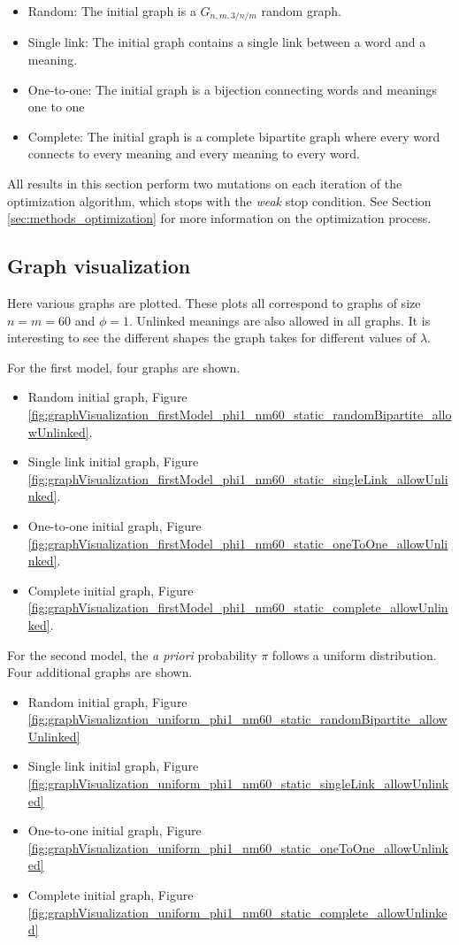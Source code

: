 \begin{itemize}
\item Random: The initial graph is a $G_{n,m,3/n/m}$ random graph.
\item Single link: The initial graph contains a single link between a word and a meaning.
\item One-to-one: The initial graph is a bijection connecting words and meanings one to one
\item Complete: The initial graph is a complete bipartite graph where every word connects to every meaning and every meaning to every word.
\end{itemize}

All results in this section perform two mutations on each iteration of the optimization algorithm, which stops with the \emph{weak} stop condition.
See Section \ref{sec:methods_optimization} for more information on the optimization process.

\subsection{Graph visualization}
\label{sec:results_new_graph}

Here various graphs are plotted.
These plots all correspond to graphs of size $n=m=60$ and $\phi=1$.
Unlinked meanings are also allowed in all graphs.
It is interesting to see the different shapes the graph takes for different values of $\lambda$.

For the first model, four graphs are shown.

\begin{itemize}
\item Random initial graph, Figure \ref{fig:graphVisualization_firstModel_phi1_nm60_static_randomBipartite_allowUnlinked}.
\item Single link initial graph, Figure \ref{fig:graphVisualization_firstModel_phi1_nm60_static_singleLink_allowUnlinked}.
\item One-to-one initial graph, Figure \ref{fig:graphVisualization_firstModel_phi1_nm60_static_oneToOne_allowUnlinked}.
\item Complete initial graph, Figure \ref{fig:graphVisualization_firstModel_phi1_nm60_static_complete_allowUnlinked}.
\end{itemize}

For the second model, the \emph{a priori} probability $\pi$ follows a uniform distribution.
Four additional graphs are shown.

\begin{itemize}
\item Random initial graph, Figure \ref{fig:graphVisualization_uniform_phi1_nm60_static_randomBipartite_allowUnlinked}
\item Single link initial graph, Figure \ref{fig:graphVisualization_uniform_phi1_nm60_static_singleLink_allowUnlinked}
\item One-to-one initial graph, Figure \ref{fig:graphVisualization_uniform_phi1_nm60_static_oneToOne_allowUnlinked}
\item Complete initial graph, Figure \ref{fig:graphVisualization_uniform_phi1_nm60_static_complete_allowUnlinked}
\end{itemize}

